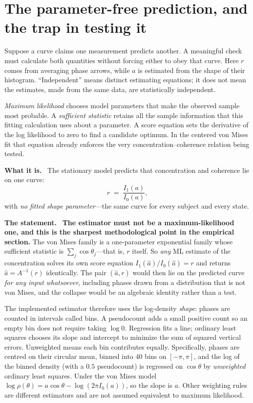 \documentclass[11pt]{article}
\newcommand{\what}{\par\smallskip\noindent\textbf{What it is.}\ }
\newcommand{\statement}{\par\smallskip\noindent\textbf{The statement.}\ }
\begin{document}
\section{The parameter-free prediction, and the trap in testing it}
\label{sec:collapse}

Suppose a curve claims one measurement predicts another. A meaningful check
must calculate both quantities without forcing either to obey that curve.
Here $r$ comes from averaging phase arrows, while $a$ is estimated from the
shape of their histogram. ``Independent'' means distinct estimating equations;
it does not mean the estimates, made from the same data, are statistically
independent.

\emph{Maximum likelihood} chooses model parameters that make the observed
sample most probable. A \emph{sufficient statistic} retains all the sample
information that this fitting calculation uses about a parameter. A score
equation sets the derivative of the log likelihood to zero to find a candidate
optimum. In the centered von Mises fit that equation already enforces the
very concentration--coherence relation being tested.

\what
The stationary model predicts that concentration and coherence lie on one
curve:
\[
 r \;=\; \frac{I_1(a)}{I_0(a)} ,
\]
with \emph{no fitted shape parameter}---the same curve for every subject and
every state.

\statement
\textbf{The estimator must not be a maximum-likelihood one, and this is the
sharpest methodological point in the empirical section.} The von Mises family
is a one-parameter exponential family whose sufficient statistic is
$\sum_j\cos\theta_j$---that is, $r$ itself. So \emph{any} ML estimate of the
concentration solves its own score equation
$I_1(\hat a)/I_0(\hat a)=r$ and returns $\hat a=A^{-1}(r)$ identically. The
pair $(\hat a,r)$ would then lie on the predicted curve \emph{for any input
whatsoever}, including phases drawn from a distribution that is not von Mises,
and the collapse would be an algebraic identity rather than a test.

The implemented estimator therefore uses the log-density \emph{shape}: phases
are counted in intervals called bins. A pseudocount adds a small positive
count so an empty bin does not require taking $\log0$. Regression fits a line;
ordinary least squares chooses its slope and intercept to minimize the sum of
squared vertical errors. Unweighted means each bin contributes equally.
Specifically, phases
are centred on their circular mean, binned into 40 bins on $[-\pi,\pi]$, and
the log of the binned density (with a $0.5$ pseudocount) is regressed on
$\cos\theta$ by \emph{unweighted} ordinary least squares. Under the von Mises
model $\log\rho(\theta)=a\cos\theta-\log(2\pi I_0(a))$, so the slope is $a$.
Other weighting rules are different estimators and are not assumed equivalent
to maximum likelihood.
\end{document}
